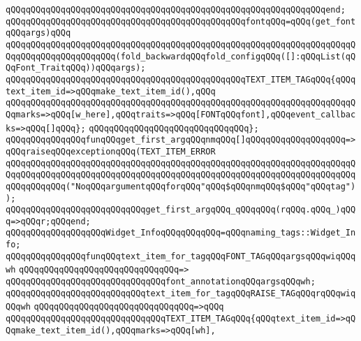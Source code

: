 \verb|qQQqqQQqqQQqqQQqqQQqqQQqqQQqqQQqqQQqqQQqqQQqqQQqqQQqqQQqqQQqqQQqend;|\newline
\newline
\verb|qQQqqQQqqQQqqQQqqQQqqQQqqQQqqQQqqQQqqQQqqQQqqQQqfontqQQq=qQQq(get_fontqQQqargs)qQQq|\newline
\verb|qQQqqQQqqQQqqQQqqQQqqQQqqQQqqQQqqQQqqQQqqQQqqQQqqQQqqQQqqQQqqQQqqQQqqQQqqQQqqQQqqQQqqQQqqQQq(fold_backwardqQQqfold_configqQQq([]:qQQqList(qQQqFont_TraitqQQq))qQQqargs);|\newline
\newline
\verb|qQQqqQQqqQQqqQQqqQQqqQQqqQQqqQQqqQQqqQQqqQQqqQQqTEXT_ITEM_TAGqQQq{qQQqtext_item_id=>qQQqmake_text_item_id(),qQQq|\newline
\verb|qQQqqQQqqQQqqQQqqQQqqQQqqQQqqQQqqQQqqQQqqQQqqQQqqQQqqQQqqQQqqQQqqQQqqQQqmarks=>qQQq[w_here],qQQqtraits=>qQQq[FONTqQQqfont],qQQqevent_callbacks=>qQQq[]qQQq};|\newline
\verb|qQQqqQQqqQQqqQQqqQQqqQQqqQQqqQQq};|\newline
\newline
\newline
\verb|qQQqqQQqqQQqqQQqfunqQQqget_first_argqQQqnmqQQq[]qQQqqQQqqQQqqQQqqQQq=>qQQqraiseqQQqexceptionqQQq(TEXT_ITEM_ERROR|\newline
\verb|qQQqqQQqqQQqqQQqqQQqqQQqqQQqqQQqqQQqqQQqqQQqqQQqqQQqqQQqqQQqqQQqqQQqqQQqqQQqqQQqqQQqqQQqqQQqqQQqqQQqqQQqqQQqqQQqqQQqqQQqqQQqqQQqqQQqqQQqqQQqqQQqqQQqqQQq("NoqQQqargumentqQQqforqQQq"qQQq$qQQqnmqQQq$qQQq"qQQqtag"));|\newline
\verb|qQQqqQQqqQQqqQQqqQQqqQQqqQQqget_first_argqQQq_qQQqqQQq(rqQQq.qQQq_)qQQq=>qQQqr;qQQqend;|\newline
\newline
\verb|qQQqqQQqqQQqqQQqqQQqWidget_InfoqQQqqQQqqQQq=qQQqnaming_tags::Widget_Info;|\newline
\newline
\verb|qQQqqQQqqQQqqQQqfunqQQqtext_item_for_tagqQQqFONT_TAGqQQqargsqQQqwiqQQqwh|\newline
\verb|qQQqqQQqqQQqqQQqqQQqqQQqqQQqqQQq=>|\newline
\verb|qQQqqQQqqQQqqQQqqQQqqQQqqQQqqQQqfont_annotationqQQqargsqQQqwh;|\newline
\newline
\verb|qQQqqQQqqQQqqQQqqQQqqQQqqQQqtext_item_for_tagqQQqRAISE_TAGqQQqrqQQqwiqQQqwh|\newline
\verb|qQQqqQQqqQQqqQQqqQQqqQQqqQQqqQQq=>qQQq|\newline
\verb|qQQqqQQqqQQqqQQqqQQqqQQqqQQqqQQqTEXT_ITEM_TAGqQQq{qQQqtext_item_id=>qQQqmake_text_item_id(),qQQqmarks=>qQQq[wh],|\newline
